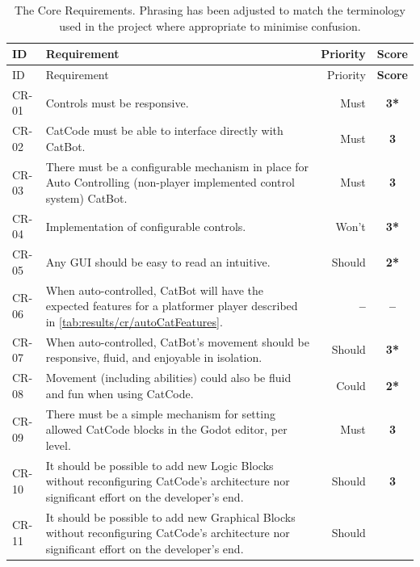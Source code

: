 \begin{center}
  \begin{longtable}{lp{9.6cm}rc}
    \caption[Core Requirements]{The Core Requirements. Phrasing has been adjusted to match the terminology used in the project where appropriate to minimise confusion.} \label{tab:results/cr/general} \\
    \toprule
    ID
    & Requirement
    & Priority
    & \textbf{Score}\\ \midrule
    \endfirsthead
    \toprule
    ID
    & Requirement
    & Priority
    & \textbf{Score}\\ \midrule
    \endhead
    CR-01
    & Controls must be responsive.
    & Must
    & \textbf{3*}
    \\
    CR-02
    & CatCode must be able to interface directly with CatBot.
    & Must
    & \textbf{3}
    \\ 
    CR-03
    & There must be a configurable mechanism in place for Auto Controlling (non-player implemented control system) CatBot.
    & Must
    & \textbf{3}
    \\
    CR-04
    & Implementation of configurable controls.
    & Won't
    & \textbf{3*}
    \\ 
    CR-05
    & Any GUI should be easy to read an intuitive.
    & Should
    & \textbf{2*}
    \\
    CR-06
    & When auto-controlled, CatBot will have the expected features for a platformer player described in \autoref{tab:results/cr/autoCatFeatures}.
    & \textbf{--}
    & \textbf{--}
    \\
    CR-07
    & When auto-controlled, CatBot's movement should be responsive, fluid, and enjoyable in isolation.
    & Should
    & \textbf{3*}
    \\
    CR-08
    & Movement (including abilities) could also be fluid and fun when using CatCode.
    & Could
    & \textbf{2*}
    \\
    CR-09
    & There must be a simple mechanism for setting allowed CatCode blocks in the Godot editor, per level.
    & Must
    & \textbf{3}
    \\
    CR-10
    & It should be possible to add new Logic Blocks without reconfiguring CatCode's architecture nor significant effort on the developer's end. 
    & Should
    & \textbf{3}
    \\
    CR-11
    & It should be possible to add new Graphical Blocks without reconfiguring CatCode's architecture nor significant effort on the developer's end. 
    & Should

\end{longtable}
\end{center}
